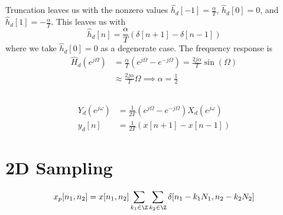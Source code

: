 \documentclass{article}
\begin{document}
Truncation leaves us with the nonzero values \(\hat{h}_d[-1] = \frac{\alpha}{T}\), \(\hat{h}_d[0] = 0\), and \(\hat{h}_d[1] = -\frac{\alpha}{T}\).
This leaves us with 
\begin{equation}
    \hat{h}_d[n] = \frac{\alpha}{T} (\delta[n + 1] - \delta[n - 1])
\end{equation}
where we take \(\hat{h}_d[0] = 0\) as a degenerate case.
The frequency response is
\begin{align}
    \hat{H}_d(e^{j \Omega}) &= \frac{\alpha}{T} (e^{j \Omega} - e^{-j \Omega}) = \frac{2j \alpha}{T} \sin(\Omega) \\
    &\approx \frac{2j \alpha}{T} \Omega \implies \alpha = \frac{1}{2}
\end{align}
\begin{center}
\end{center}

\subsection{}

\begin{align}
    Y_d(e^{j \omega}) &= \frac{1}{2T} (e^{j \Omega} - e^{-j \Omega}) X_d(e^{j \omega}) \\
    y_d[n] &= \frac{1}{2T} (x[n + 1] - x[n - 1])
\end{align}

\section{2D Sampling}

\begin{equation}
    x_p[n_1, n_2] = x[n_1, n_2] \sum_{k_1 \in \Z} \sum_{k_2 \in \Z} \delta[n_1 - k_1 N_1, n_2 - k_2 N_2]
\end{equation}
\end{document}
